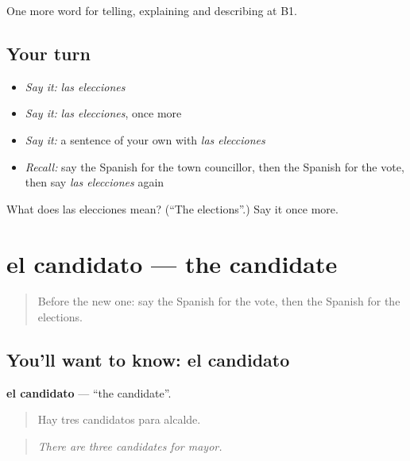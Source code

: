 \begin{grammarlens}[title={What you've built}]
One more word for telling, explaining and describing at B1.
\end{grammarlens}

\subsection*{Your turn}
\begin{itemize}
\raggedright
  \item \emph{Say it:} \emph{las elecciones}
  \item \emph{Say it:} \emph{las elecciones}, once more
  \item \emph{Say it:} a sentence of your own with \emph{las elecciones}
  \item \emph{Recall:} say the Spanish for the town councillor, then the Spanish for the vote, then say \emph{las elecciones} again
\end{itemize}

\begin{tcolorbox}[breakable,colback=teal!4,colframe=teal!35!black,title={Before you move on}]
What does las elecciones mean? (\textquotedblleft{}The elections\textquotedblright{}.) Say it once more.
\end{tcolorbox}
\section[el candidato]{el candidato — the candidate}

\label{lesson:ES-C602-candidato}



\begin{quote}
Before the new one: say the Spanish for the vote, then the Spanish for the elections.
\end{quote}

\subsection*{You'll want to know: el candidato}
\textbf{el candidato} — \textquotedblleft{}the candidate\textquotedblright{}.

\begin{quote}
Hay tres candidatos para alcalde.
\end{quote}

\begin{quote}
\emph{There are three candidates for mayor.}
\end{quote}

